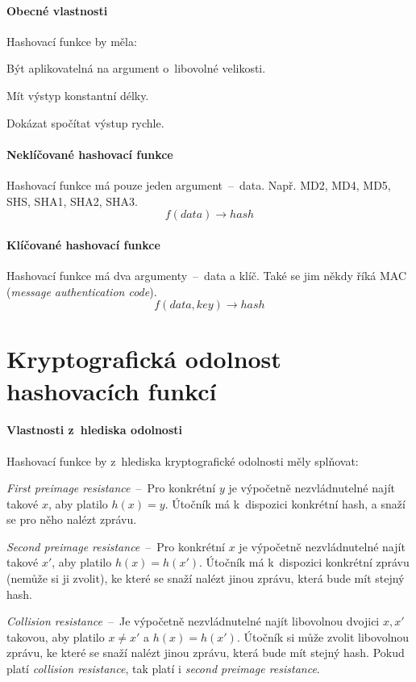 \paragraph*{Obecné vlastnosti} Hashovací funkce by měla: \begin{compactitem}
    \item Být aplikovatelná na argument o~libovolné velikosti.
    \item Mít výstyp konstantní délky.
    \item Dokázat spočítat výstup rychle.
\end{compactitem}

\paragraph*{Neklíčované hashovací funkce} Hashovací funkce má pouze jeden argument~--~data. Např. MD2, MD4, MD5, SHS, SHA1, SHA2, SHA3. $$f(data) \rightarrow hash$$

\paragraph*{Klíčované hashovací funkce} Hashovací funkce má dva argumenty~--~data a klíč. Také se jim někdy říká MAC (\textit{message authentication code}). $$f(data, key) \rightarrow hash$$


\section{Kryptografická odolnost hashovacích funkcí}

\paragraph*{Vlastnosti z~hlediska odolnosti} Hashovací funkce by z~hlediska kryptografické odolnosti měly splňovat: \begin{compactitem}
    \item \textit{First preimage resistance}~--~Pro konkrétní $y$ je výpočetně nezvládnutelné najít takové $x$, aby platilo $h(x) = y$. Útočník má k~dispozici konkrétní hash, a snaží se pro něho nalézt zprávu.
    \item \textit{Second preimage resistance}~--~Pro konkrétní $x$ je výpočetně nezvládnutelné najít takové $x'$, aby platilo $h(x) = h(x')$. Útočník má k~dispozici konkrétní zprávu (nemůže si ji zvolit), ke které se snaží nalézt jinou zprávu, která bude mít stejný hash.
    \item \textit{Collision resistance}~--~Je výpočetně nezvládnutelné najít libovolnou dvojici $x, x'$ takovou, aby platilo $x \neq x'$ a $h(x) = h(x')$. Útočník si může zvolit libovolnou zprávu, ke které se snaží nalézt jinou zprávu, která bude mít stejný hash. Pokud platí \textit{collision resistance}, tak platí i \textit{second preimage resistance}.
\end{compactitem}

